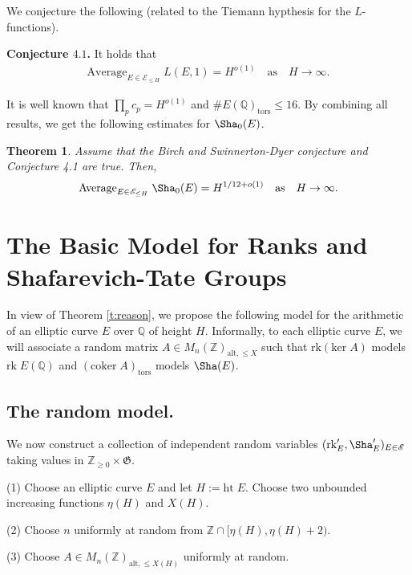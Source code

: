 \documentclass[12pt,reqno]{amsart}
\newtheorem{thm}{Theorem}[section]
\numberwithin{equation}{section}
\def\Z{{\mathbb Z}}
\def\Q{{\mathbb Q}}
\def\sE{{\mathscr E}}
\def\sG{{\mathfrak G}}
\begin{document}
\smallskip

We conjecture the following (related to the Tiemann hypthesis for the $L$-functions).

\smallskip

{\bf Conjecture $\mathbf{4.1}$.} It holds that
\begin{align*}
\text{Average}_{E \in \sE_{\le H}} \; L(E, 1) = H^{o(1)} \quad \text{as} \quad H \to \infty.
\end{align*}

It is well known that $\prod_p c_p = H^{o(1)}$ and $\# E(\Q)_{\text{tors}} \le 16$. By combining all results, we get the following estimates for $\Sha_0(E)$.

\begin{thm}\label{t:sizeSha}
Assume that the Birch and Swinnerton-Dyer conjecture and Conjecture 4.1 are true. Then,
\begin{align*}
\text{Average}_{E \in \sE_{\le H}} \; \Sha_0(E) = H^{1/12 + o(1)} \quad \text{as} \quad H \to \infty.
\end{align*}
\end{thm}

\section{The Basic Model for Ranks and Shafarevich-Tate Groups}

In view of Theorem \ref{t:reason}, we propose the following model for the arithmetic of an elliptic curve $E$ over $\Q$ of height $H$. Informally, to each elliptic curve $E$, we will associate a random matrix $A \in M_n(\Z)_{\text{alt}, \le X}$ such that $\text{rk}(\text{ker} \; A)$ models $\text{rk} \; E(\Q)$ and $(\text{coker} \; A)_{\text{tors}}$ models $\Sha(E)$.


\subsection{The random model.}

We now construct a collection of independent random variables $(\text{rk}'_E, \Sha'_E)_{E \in \sE}$ taking values in $\Z_{\ge 0} \times \sG$.

(1) Choose an elliptic curve $E$ and let $H:=\text{ht} \; E$. Choose two unbounded increasing functions $\eta(H)$ and $X(H)$.

(2) Choose $n$ uniformly at random from $\Z \cap [\eta(H), \eta(H) + 2)$.

(3) Choose $A \in M_n(\Z)_{\text{alt}, \le X(H)}$ uniformly at random.
\end{document}
